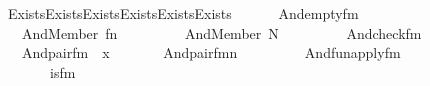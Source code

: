 \begin{isabellebody}
\ \ \ \ Exists{\isacharparenleft}{\kern0pt}Exists{\isacharparenleft}{\kern0pt}Exists{\isacharparenleft}{\kern0pt}Exists{\isacharparenleft}{\kern0pt}Exists{\isacharparenleft}{\kern0pt}Exists{\isacharparenleft}{\kern0pt}\isanewline
\ \ \ \ \ \ And{\isacharparenleft}{\kern0pt}empty{\isacharunderscore}{\kern0pt}fm{\isacharparenleft}{\kern0pt}{}{\isacharparenright}{\kern0pt}{\isacharcomma}{\kern0pt}\ \isanewline
\ \ \ \ \ \ And{\isacharparenleft}{\kern0pt}Member{\isacharparenleft}{\kern0pt}{}{\isacharcomma}{\kern0pt}\ fn\ {\isacharhash}{\kern0pt}{\isacharplus}{\kern0pt}\ {}{\isacharparenright}{\kern0pt}{\isacharcomma}{\kern0pt}\ \isanewline
\ \ \ \ \ \ And{\isacharparenleft}{\kern0pt}Member{\isacharparenleft}{\kern0pt}{}{\isacharcomma}{\kern0pt}\ N\ {\isacharhash}{\kern0pt}{\isacharplus}{\kern0pt}\ {}{\isacharparenright}{\kern0pt}{\isacharcomma}{\kern0pt}\ \isanewline
\ \ \ \ \ \ And{\isacharparenleft}{\kern0pt}check{\isacharunderscore}{\kern0pt}fm{\isacharparenleft}{\kern0pt}{}{\isacharcomma}{\kern0pt}\ {}{\isacharcomma}{\kern0pt}\ {}{\isacharparenright}{\kern0pt}{\isacharcomma}{\kern0pt}\ \isanewline
\ \ \ \ \ \ And{\isacharparenleft}{\kern0pt}pair{\isacharunderscore}{\kern0pt}fm{\isacharparenleft}{\kern0pt}{}{\isacharcomma}{\kern0pt}\ {}{\isacharcomma}{\kern0pt}\ x{\isacharhash}{\kern0pt}{\isacharplus}{\kern0pt}{}{\isacharparenright}{\kern0pt}{\isacharcomma}{\kern0pt}\ \isanewline
\ \ \ \ \ \ And{\isacharparenleft}{\kern0pt}pair{\isacharunderscore}{\kern0pt}fm{\isacharparenleft}{\kern0pt}n{\isacharhash}{\kern0pt}{\isacharplus}{\kern0pt}{}{\isacharcomma}{\kern0pt}\ {}{\isacharcomma}{\kern0pt}\ {}{\isacharparenright}{\kern0pt}{\isacharcomma}{\kern0pt}\ \isanewline
\ \ \ \ \ \ And{\isacharparenleft}{\kern0pt}fun{\isacharunderscore}{\kern0pt}apply{\isacharunderscore}{\kern0pt}fm{\isacharparenleft}{\kern0pt}{}{\isacharcomma}{\kern0pt}\ {}{\isacharcomma}{\kern0pt}\ {}{\isacharparenright}{\kern0pt}{\isacharcomma}{\kern0pt}\ \isanewline
\ \ \ \ \ \ \ \ \ \ is{\isacharunderscore}{\kern0pt}{}{\isacharunderscore}{\kern0pt}fm{\isacharparenleft}{\kern0pt}{}{\isacharparenright}{\kern0pt}{\isacharparenright}{\kern0pt}{\isacharparenright}{\kern0pt}{\isacharparenright}{\kern0pt}{\isacharparenright}{\kern0pt}{\isacharparenright}{\kern0pt}{\isacharparenright}{\kern0pt}{\isacharparenright}{\kern0pt}{\isacharparenright}{\kern0pt}{\isacharparenright}{\kern0pt}{\isacharparenright}{\kern0pt}{\isacharparenright}{\kern0pt}{\isacharparenright}{\kern0pt}{\isacharparenright}{\kern0pt}{\isachardoublequoteclose}\ \isanewline

\end{isabellebody}
